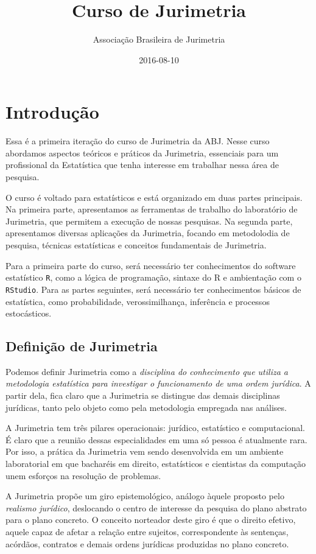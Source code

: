 \documentclass[]{book}
\title{Curso de Jurimetria}
\author{Associação Brasileira de Jurimetria}
\date{2016-08-10}
\begin{document}
\maketitle

{
\setcounter{tocdepth}{1}
\tableofcontents
}
\chapter{Introdução}\label{introducao}

Essa é a primeira iteração do curso de Jurimetria da ABJ. Nesse curso
abordamos aspectos teóricos e práticos da Jurimetria, essenciais para um
profissional da Estatística que tenha interesse em trabalhar nessa área
de pesquisa.

O curso é voltado para estatísticos e está organizado em duas partes
principais. Na primeira parte, apresentamos as ferramentas de trabalho
do laboratório de Jurimetria, que permitem a execução de nossas
pesquisas. Na segunda parte, apresentamos diversas aplicações da
Jurimetria, focando em metodolodia de pesquisa, técnicas estatísticas e
conceitos fundamentais de Jurimetria.

Para a primeira parte do curso, será necessário ter conhecimentos do
software estatístico \texttt{R}, como a lógica de programação, sintaxe
do R e ambientação com o \texttt{RStudio}. Para as partes seguintes,
será necessário ter conhecimentos básicos de estatística, como
probabilidade, verossimilhança, inferência e processos estocásticos.

\section{Definição de Jurimetria}\label{definicao-de-jurimetria}

Podemos definir Jurimetria como a \emph{disciplina do conhecimento que
utiliza a metodologia estatística para investigar o funcionamento de uma
ordem jurídica}. A partir dela, fica claro que a Jurimetria se distingue
das demais disciplinas jurídicas, tanto pelo objeto como pela
metodologia empregada nas análises.

A Jurimetria tem três pilares operacionais: jurídico, estatístico e
computacional. É claro que a reunião dessas especialidades em uma só
pessoa é atualmente rara. Por isso, a prática da Jurimetria vem sendo
desenvolvida em um ambiente laboratorial em que bacharéis em direito,
estatísticos e cientistas da computação unem esforços na resolução de
problemas.

A Jurimetria propõe um giro epistemológico, análogo àquele proposto pelo
\emph{realismo jurídico}, deslocando o centro de interesse da pesquisa
do plano abstrato para o plano concreto. O conceito norteador deste giro
é que o direito efetivo, aquele capaz de afetar a relação entre
sujeitos, correspondente às sentenças, acórdãos, contratos e demais
ordens jurídicas produzidas no plano concreto.
\end{document}
